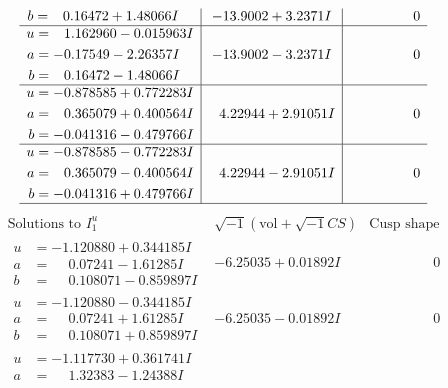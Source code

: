 \documentclass[1p]{elsarticle_modified}
\theoremstyle{definition}
\newcommand{\I}{\sqrt{-1}}
\begin{document}
$$\begin{array}{c|c|c}
\begin{aligned}
b &= \phantom{-}0.16472 + 1.48066 I\end{aligned}
 & -13.9002 + 3.2371 I & \phantom{-0.000000 } 0 \\ \hline\begin{aligned}
u &= \phantom{-}1.162960 - 0.015963 I \\
a &= -0.17549 - 2.26357 I \\
b &= \phantom{-}0.16472 - 1.48066 I\end{aligned}
 & -13.9002 - 3.2371 I & \phantom{-0.000000 } 0 \\ \hline\begin{aligned}
u &= -0.878585 + 0.772283 I \\
a &= \phantom{-}0.365079 + 0.400564 I \\
b &= -0.041316 - 0.479766 I\end{aligned}
 & \phantom{-}4.22944 + 2.91051 I & \phantom{-0.000000 } 0 \\ \hline\begin{aligned}
u &= -0.878585 - 0.772283 I \\
a &= \phantom{-}0.365079 - 0.400564 I \\
b &= -0.041316 + 0.479766 I\end{aligned}
 & \phantom{-}4.22944 - 2.91051 I & \phantom{-0.000000 } 0\\
 \hline 
 \end{array}$$\newpage$$\begin{array}{c|c|c}  
\text{Solutions to }I^u_{1}& \I (\text{vol} + \sqrt{-1}CS) & \text{Cusp shape}\\
 \hline 
\begin{aligned}
u &= -1.120880 + 0.344185 I \\
a &= \phantom{-}0.07241 - 1.61285 I \\
b &= \phantom{-}0.108071 - 0.859897 I\end{aligned}
 & -6.25035 + 0.01892 I & \phantom{-0.000000 } 0 \\ \hline\begin{aligned}
u &= -1.120880 - 0.344185 I \\
a &= \phantom{-}0.07241 + 1.61285 I \\
b &= \phantom{-}0.108071 + 0.859897 I\end{aligned}
 & -6.25035 - 0.01892 I & \phantom{-0.000000 } 0 \\ \hline\begin{aligned}
u &= -1.117730 + 0.361741 I \\
a &= \phantom{-}1.32383 - 1.24388 I \\

\end{aligned}
\end{array}$$
\end{document}
